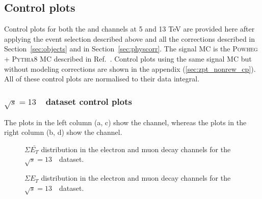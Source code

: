 
%
\subsection{Control plots}
\label{subsec:contolPlotsZ}

Control plots for both the \Zee and \Zmm channels at 5 and 13 TeV are provided here after applying the event selection described above and all the corrections described in Section~\ref{sec:objects} and in Section~\ref{sec:physcorr}. 
The signal MC is the \textsc{Powheg} + \textsc{Pythia8} MC described in Ref.~\cite{Kretzschmar:2657141}.
Control plots using the same signal MC but without \pt modeling corrections are shown in the appendix (\ref{sec:zpt_nonrew_cp}).
All of these control plots are normalised to their data integral.

\subsubsection{$\sqrt{s} = 13$~\TeV\ dataset control plots}
\label{ssubsec:Z_CP_MCrew}
The plots in the left column (a, c) show the \Zee channel, whereas the plots in the right column (b, d) show the \Zmm channel.

\begin{figure}[h]
\centering
{}
\caption{$\Sigma \bar{E_T}$ distribution in the electron and muon \Zboson decay channels for the $\sqrt{s} = 13$~\TeV\ dataset. }\end{figure}
%

\begin{figure}[h]
\centering
{}
\caption{$\Sigma{E_T}$ distribution in the electron and muon \Zboson decay channels for the $\sqrt{s} = 13$~\TeV\ dataset. }\end{figure}


